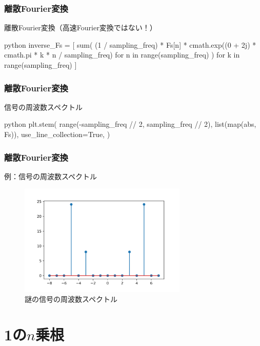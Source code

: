 \documentclass[dvipdfmx,11pt,notheorems]{beamer}
\theoremstyle{definition}
\begin{document}
\begin{frame}[fragile]\frametitle{離散Fourier変換}
\begin{exampleblock}{離散Fourier変換（高速Fourier変換ではない！）}
\begin{pygments}{python}
inverse_Fs = [
    sum(
        (1 / sampling_freq)
        * Fs[n]
        * cmath.exp((0 + 2j) 
        * cmath.pi * k * n / sampling_freq)
        for n in range(sampling_freq)
    )
    for k in range(sampling_freq)
]
\end{pygments}
\end{exampleblock}

\end{frame}

\begin{frame}[fragile]\frametitle{離散Fourier変換}
\begin{exampleblock}{信号の周波数スペクトル}
\begin{pygments}{python}
plt.stem(
    range(-sampling_freq // 2, sampling_freq // 2),
    list(map(abs, Fs)),
    use_line_collection=True,
)
\end{pygments}
\end{exampleblock}

\end{frame}

\begin{frame}[fragile]\frametitle{離散Fourier変換}

\begin{block}{例：信号の周波数スペクトル}
\begin{figure}
  \centering
  \includegraphics[width=8cm]{stem.png}
  \caption{謎の信号の周波数スペクトル}
\end{figure}

\end{block}
\end{frame}

\section{1の$n$乗根}
\end{document}
